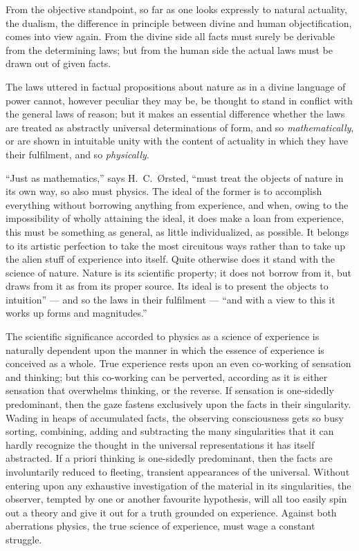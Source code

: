 \documentclass[12pt,a4paper]{book}
\begin{document}
From the objective standpoint, so far as one looks expressly
to natural actuality, the dualism, the difference in principle between divine and
human objectification, comes into view again. From the divine side all facts must
surely be derivable from the determining laws; but from the human side the actual laws
must be drawn out of given facts.

The laws uttered in factual propositions about nature as in a divine language of power
cannot, however peculiar they may be, be thought to stand in conflict with the general
laws of reason; but it makes an essential difference whether the laws are treated as
abstractly universal determinations of form, and so \emph{mathematically}, or are shown
in intuitable unity with the content of actuality in which they have their fulfilment,
and so \emph{physically}.

``Just as mathematics,'' says H.\ C.\ Ørsted, ``must treat the objects of nature in its
own way, so also must physics. The ideal of the former is to accomplish everything
without borrowing anything from experience, and when, owing to the impossibility of
wholly attaining the ideal, it does make a loan from experience, this must be something
as general, as little individualized, as possible. It belongs to its artistic perfection
to take the most circuitous ways rather than to take up the alien stuff of experience
into itself. Quite otherwise does it stand with the science of nature. Nature is its
scientific property; it does not borrow from it, but draws from it as from its proper
source. Its ideal is to present the objects to intuition'' --- and so the laws in their
fulfilment --- ``and with a view to this it works up forms and magnitudes.''

The scientific significance accorded to physics as a science of experience is naturally
dependent upon the manner in which the essence of experience is conceived as a whole.
True experience rests upon an even co-working of sensation and thinking; but this
co-working can be perverted, according as
it is either sensation that overwhelms thinking, or the reverse. If sensation is
one-sidedly predominant, then the gaze fastens exclusively upon the facts in their
singularity. Wading in heaps of accumulated facts, the observing consciousness gets so
busy sorting, combining, adding and subtracting the many singularities that it can
hardly recognize the thought in the universal representations it has itself abstracted.
If a priori thinking is one-sidedly predominant, then the facts are involuntarily
reduced to fleeting, transient appearances of the universal. Without entering upon any
exhaustive investigation of the material in its singularities, the observer, tempted by
one or another favourite hypothesis, will all too easily spin out a theory and give it
out for a truth grounded on experience. Against both aberrations physics, the true
science of experience, must wage a constant struggle.
\end{document}
